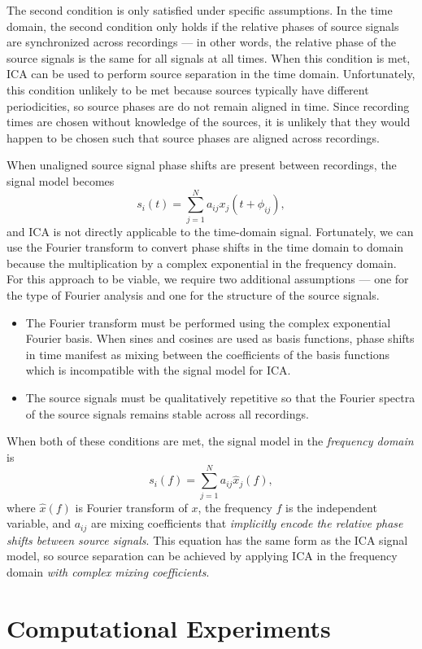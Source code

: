 \documentclass[10pt]{article}
\begin{document}
The second condition is only satisfied under specific assumptions. In the time domain, the
second condition only holds if the relative phases of source signals are synchronized
across recordings --- in other words, the relative phase of the source signals is the same
for all signals at all times. When this condition is met, ICA can be used to perform source
separation in the time domain. Unfortunately, this condition unlikely to be met because
sources typically have different periodicities, so source phases are do not remain aligned
in time. Since recording times are chosen without knowledge of the sources, it is unlikely
that they would happen to be chosen such that source phases are aligned across recordings.

When unaligned source signal phase shifts are present between recordings, the signal model
becomes
$$
s_i(t) = \sum_{j=1}^N a_{ij} x_j(t + \phi_{ij}),
$$
and ICA is not directly applicable to the time-domain signal. Fortunately, we can use the
Fourier transform to convert phase shifts in the time domain to domain because the
multiplication by a complex exponential in the frequency domain. For this approach to be
viable, we require two additional assumptions --- one for the type of Fourier analysis
and one for the structure of the source signals.
\begin{itemize}
    \item The Fourier transform must be performed using the complex exponential Fourier
        basis. When sines and cosines are used as basis functions, phase shifts in time
        manifest as mixing between the coefficients of the basis functions which is
        incompatible with the signal model for ICA.

    \item The source signals must be qualitatively repetitive so that the Fourier
        spectra of the source signals remains stable across all recordings.
\end{itemize}
When both of these conditions are met, the signal model in the \emph{frequency domain} is
$$
s_i(f) = \sum_{j=1}^N a_{ij} \hat{x}_j(f),
$$
where $\hat{x}(f)$ is Fourier transform of $x$, the frequency $f$ is the independent
variable, and $a_{ij}$ are mixing coefficients that \emph{implicitly encode the relative
phase shifts between source signals}. This equation has the same form as the ICA signal
model, so source separation can be achieved by applying ICA in the frequency domain
\emph{with complex mixing coefficients}.

\section{Computational Experiments}
\end{document}
